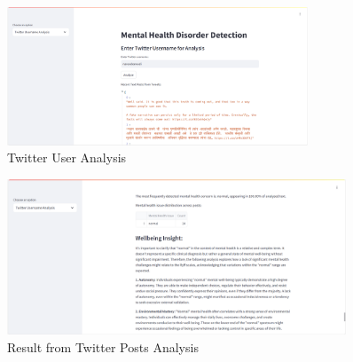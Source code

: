 \begin{figure}[h!]  
    \centering
    \includegraphics[width=0.8\textwidth]{App Images/08 Interface.png}  
    \caption{Twitter User Analysis}
    \label{09i}  %
\end{figure}

\pagebreak

\begin{figure}[h!]  
    \centering
    \includegraphics[width=0.9\textwidth]{App Images/10 Interface.png}  
    \caption{Result from Twitter Posts Analysis}
    \label{10i}  %
\end{figure}


